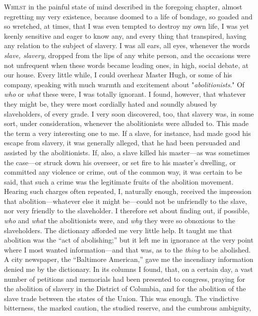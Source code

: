 \textsc{Whilst} in the painful state of mind described in the foregoing
chapter, almost regretting my very existence, because doomed to a life
of bondage, so goaded and so wretched, at times, that I was even tempted
to destroy my own life, I was yet keenly sensitive and eager to know
any, and every thing that transpired, having any relation to the subject
of slavery. I was all ears, all eyes, whenever the words \emph{slave,
slavery}, dropped from the lips of any white person, and the occasions
were not unfrequent when these words became leading ones, in high,
social debate, at our house. Every little while, I could overhear Master
Hugh, or some of his company, speaking with much warmth and excitement
about "\emph{abolitionists}." Of \emph{who} or \emph{what} these were, I
was totally ignorant. I found, however, that whatever they might be,
they were most {}cordially hated and soundly abused by slaveholders, of
every grade. I very soon discovered, too, that slavery was, in some
sort, under consideration, whenever the abolitionists were alluded to.
This made the term a very interesting one to me. If a slave, for
instance, had made good his escape from slavery, it was generally
alleged, that he had been persuaded and assisted by the abolitionists.
If, also, a slave killed his master---as was sometimes the case---or
struck down his overseer, or set fire to his master's dwelling, or
committed any violence or crime, out of the common way, it was certain
to be said, that such a crime was the legitimate fruits of the abolition
movement. Hearing such charges often repeated, I, naturally enough,
received the impression that abolition---whatever else it might
be---could not be unfriendly to the slave, nor very friendly to the
slaveholder. I therefore set about finding out, if possible, \emph{who}
and \emph{what} the abolitionists were, and \emph{why} they were so
obnoxious to the slaveholders. The dictionary afforded me very little
help. It taught me that abolition was the ``act of abolishing;'' but it
left me in ignorance at the very point where I most wanted
information---and that was, as to the \emph{thing} to be abolished. A
city newspaper, the ``Baltimore American,'' gave me the incendiary
information denied me by the dictionary. In its columns I found, that,
on a certain day, a vast number of petitions and memorials had been
presented to congress, praying for the abolition of slavery in the
District of Columbia, and for the abolition of the slave trade between
the states of the Union. This was enough. The vindictive bitterness,
{}the marked caution, the studied reserve, and the cumbrous ambiguity,
